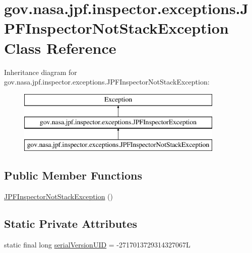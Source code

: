 \hypertarget{classgov_1_1nasa_1_1jpf_1_1inspector_1_1exceptions_1_1_j_p_f_inspector_not_stack_exception}{}\section{gov.\+nasa.\+jpf.\+inspector.\+exceptions.\+J\+P\+F\+Inspector\+Not\+Stack\+Exception Class Reference}
\label{classgov_1_1nasa_1_1jpf_1_1inspector_1_1exceptions_1_1_j_p_f_inspector_not_stack_exception}
Inheritance diagram for gov.\+nasa.\+jpf.\+inspector.\+exceptions.\+J\+P\+F\+Inspector\+Not\+Stack\+Exception\+:\begin{figure}[H]
\begin{center}
\leavevmode
\includegraphics[height=3.000000cm]{classgov_1_1nasa_1_1jpf_1_1inspector_1_1exceptions_1_1_j_p_f_inspector_not_stack_exception}
\end{center}
\end{figure}
\subsection*{Public Member Functions}
\begin{DoxyCompactItemize}
\item 
\hyperlink{classgov_1_1nasa_1_1jpf_1_1inspector_1_1exceptions_1_1_j_p_f_inspector_not_stack_exception_a0b93022cedf78aa4d25ec331969ab4b4}{J\+P\+F\+Inspector\+Not\+Stack\+Exception} ()
\end{DoxyCompactItemize}
\subsection*{Static Private Attributes}
\begin{DoxyCompactItemize}
\item 
static final long \hyperlink{classgov_1_1nasa_1_1jpf_1_1inspector_1_1exceptions_1_1_j_p_f_inspector_not_stack_exception_a992a7fb7e1d73cb6ed11c6ddfcd394b3}{serial\+Version\+U\+ID} = -\/2717013729314327067L
\end{DoxyCompactItemize}


